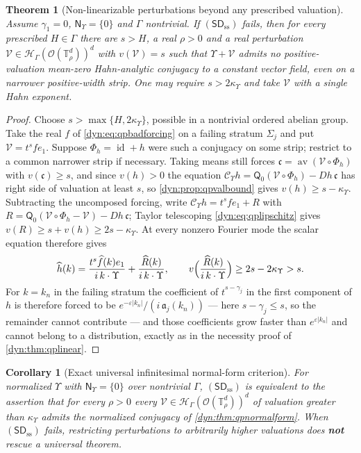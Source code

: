 \documentclass[11pt,letterpaper]{article}
\newtheorem{theorem}{Theorem}[section]
\newtheorem{corollary}[corollary]{Corollary}
\theoremstyle{definition}
\theoremstyle{remark}
\newcommand{\HH}{\mathscr H}
\newcommand{\OO}{\mathcal O}
\newcommand{\id}{\operatorname{id}}
\newcommand{\eps}{\varepsilon}
\newcommand{\sdss}{\mathsf{SD}_{\mathrm{ss}}}
\newcommand{\TT}{\mathbb T}
\newcommand{\strip}{\OO(\TT^{d}_{\rho})}
\newcommand{\Cups}{\mathcal C_{\Upsilon}}
\newcommand{\qlat}{\mathsf N_{\Upsilon}}
\newcommand{\kups}{\kappa_{\Upsilon}}
\newcommand{\fla}{\mathfrak a}
\newcommand{\av}{\operatorname{av}}
\newcommand{\Qz}{\mathsf Q_{0}}
\numberwithin{equation}{section}
\begin{document}
\begin{theorem}[Non-linearizable perturbations beyond any prescribed
valuation]\label{dyn:thm:qpnecessity}
Assume $\gamma_1=0$, $\qlat=\{0\}$ and $\Gamma$ nontrivial. If $(\sdss)$
fails, then for every prescribed $H\in\Gamma$ there are $s>H$, a real
$\rho>0$ and a real perturbation $\mathcal V\in\HH_\Gamma(\strip)^{d}$ with
$v(\mathcal V)=s$ such that $\Upsilon+\mathcal V$ admits \emph{no}
positive-valuation mean-zero Hahn-analytic conjugacy to a constant vector
field, even on a narrower positive-width strip. One may require
$s>2\kups$ and take $\mathcal V$ with a single Hahn exponent.
\end{theorem}
\begin{proof}
Choose $s>\max\{H,2\kups\}$, possible in a nontrivial ordered abelian
group. Take the real $f$ of \eqref{dyn:eq:qpbadforcing} on a failing
stratum $\Sigma_j$ and put $\mathcal V=t^{s}fe_1$. Suppose
$\Phi_h=\id+h$ were such a conjugacy on some strip; restrict to a common
narrower strip if necessary. Taking means still forces
$\mathfrak c=\av(\mathcal V\circ\Phi_h)$ with $v(\mathfrak c)\ge s$, and
since $v(h)>0$ the equation
$\Cups h=\Qz(\mathcal V\circ\Phi_h)-Dh\,\mathfrak c$ has right side of
valuation at least $s$, so \cref{dyn:prop:qpvalbound} gives
$v(h)\ge s-\kups$. Subtracting the uncomposed forcing, write
$\Cups h=t^{s}fe_1+R$ with
$R=\Qz(\mathcal V\circ\Phi_h-\mathcal V)-Dh\,\mathfrak c$; Taylor
telescoping \eqref{dyn:eq:qplipschitz} gives $v(R)\ge s+v(h)\ge2s-\kups$.
At every nonzero Fourier mode the scalar equation therefore gives
\[
 \widehat h(k)=\frac{t^{s}\widehat f(k)e_1}{i\,k\cdot\Upsilon}
 +\frac{\widehat R(k)}{i\,k\cdot\Upsilon},\qquad
 v\Bigl(\frac{\widehat R(k)}{i\,k\cdot\Upsilon}\Bigr)\ge2s-2\kups>s .
\]
For $k=k_n$ in the failing stratum the coefficient of $t^{s-\gamma_j}$ in
the first component of $h$ is therefore forced to be
$e^{-\eps|k_n|}/(i\,\fla_j(k_n))$ --- here $s-\gamma_j\le s$, so the
remainder cannot contribute --- and those coefficients grow faster than
$e^{\eps|k_n|}$ and cannot belong to a distribution, exactly as in the
necessity proof of \cref{dyn:thm:qplinear}.
\end{proof}

\begin{corollary}[Exact universal infinitesimal normal-form criterion]
\label{dyn:cor:qpequivalence}
For normalized $\Upsilon$ with $\qlat=\{0\}$ over nontrivial $\Gamma$,
$(\sdss)$ is equivalent to the assertion that for every $\rho>0$ every
$\mathcal V\in\HH_\Gamma(\strip)^{d}$ of valuation greater than $\kups$
admits the normalized conjugacy of \cref{dyn:thm:qpnormalform}. When
$(\sdss)$ fails, restricting perturbations to arbitrarily higher valuations
does \textbf{not} rescue a universal theorem.
\end{corollary}
\end{document}
